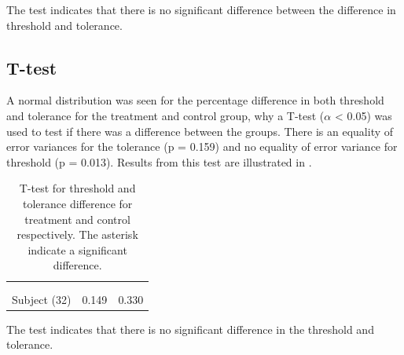 The test indicates that there is no significant difference between the difference in threshold and tolerance.

\subsection{T-test}
A normal distribution was seen for the percentage difference in both threshold and tolerance for the treatment and control group, why a T-test ($\alpha$ < 0.05) was used to test if there was a difference between the groups. 
There is an equality of error variances for the tolerance (p = 0.159) and no equality of error variance for threshold (p = 0.013).
Results from this test are illustrated in .

\begin{longtable} {l|c|c}
	\caption{T-test for threshold and tolerance difference for treatment and control respectively. The asterisk indicate a significant difference.}	\label{tab:T-test1} \\
	 \cellcolor[HTML]{C0C0C0} {} & 
 \multicolumn{1}{c|}{ \cellcolor[HTML]{C0C0C0}{\textbf{Threshold}}} & \multicolumn{1}{c}{ \cellcolor[HTML]{C0C0C0}{\textbf{Tolerance}}}  	\\  \rule{0pt}{3ex} 
  \cellcolor[HTML]{C0C0C0}{} &
 \multicolumn{1}{c|}{ \cellcolor[HTML]{C0C0C0}{Difference }} & \multicolumn{1}{|c}{ \cellcolor[HTML]{C0C0C0}{Difference}}  	\\ \hline
Subject (32) & 0.149 & 0.330  \\ \hline

\end{longtable}
\vspace{-.5cm}

The test indicates that there is no significant difference in the threshold and tolerance.

